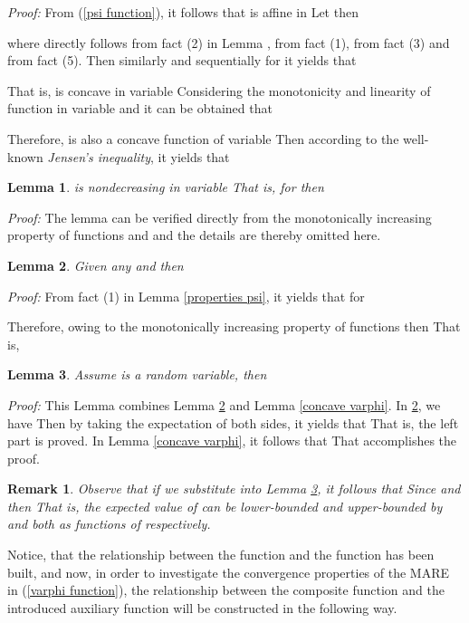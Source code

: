 \documentclass[journal]{IEEEtran}
\newtheorem{lemma}{Lemma}
\newtheorem{remark}{Remark}
\begin{document}
{\emph{Proof:}} From (\ref{psi function}), it follows that  is affine in  \iffalse From fact (5) in Lemma \ref{psi lemma}, we know  are concave functions.\fi Let  then


where  directly follows from fact (2) in Lemma ,  from fact (1),  from fact (3) and  from fact (5). Then similarly and sequentially for  it yields that

That is,  is concave in variable  Considering the monotonicity and linearity of function  in variable  and  it can be obtained that

Therefore,  is also a concave function of variable  Then according to the well-known {\emph{Jensen's inequality}}, it yields that


\begin{lemma}\label{nondecreasing varphi}
 is nondecreasing in variable  That is, for  then 
\end{lemma}

{\emph{Proof:}} The lemma can be verified directly from the monotonically increasing property of functions  and  and the details are thereby omitted here.


\begin{lemma}
\label{varphi lowerbound}
Given any  and  then 
\end{lemma}

{\emph{Proof:}} From fact (1) in Lemma \ref{properties psi}, it yields that for 

Therefore, owing to the monotonically increasing property of functions  then  That is,


\begin{lemma}\label{varphi bound}
Assume  is a random variable, then

\end{lemma}

{\emph{Proof:}}
This Lemma combines Lemma \ref{varphi lowerbound} and Lemma \ref{concave varphi}. In \ref{varphi lowerbound}, we have  Then by taking the expectation of both sides, it yields that  That is, the left part is proved. In Lemma \ref{concave varphi}, it follows that  That accomplishes the proof.
\begin{remark}\label{p bound}
Observe that if we substitute  into Lemma \ref{varphi bound}, it follows that  Since  and  then  That is, the expected value of  can be lower-bounded and upper-bounded by  and  both as functions of  respectively.
\end{remark}

\fi

Notice, that the relationship between the function  and the function  has been built, and now, in order to investigate the convergence properties of the MARE in (\ref{varphi function}), the relationship between the composite function  and the introduced auxiliary function  will be constructed in the following way.
\end{document}
